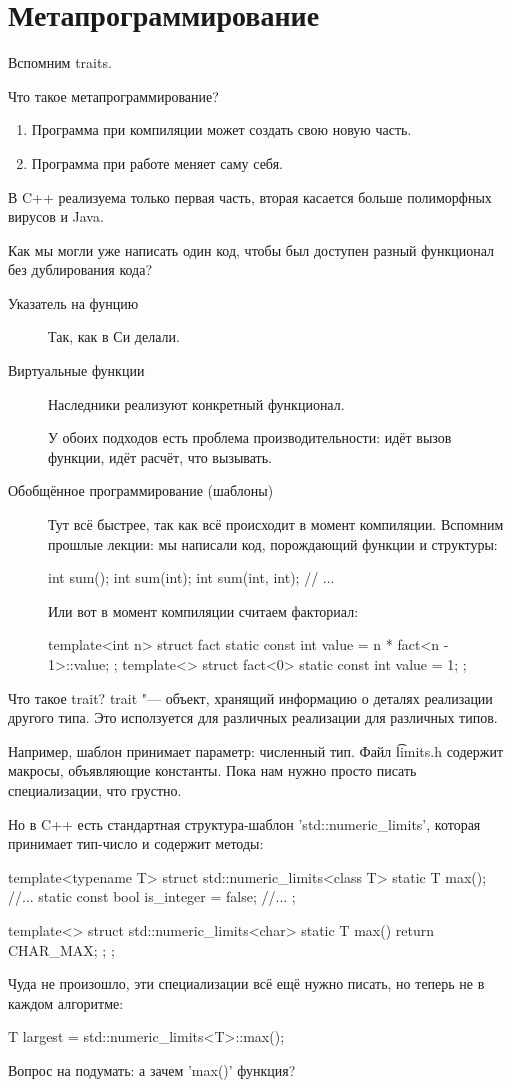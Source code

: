 \chapter{Метапрограммирование}

Вспомним traits.

Что такое метапрограммирование?
\begin{enumerate}
\item
	Программа при компиляции может создать свою новую часть.
\item
	Программа при работе меняет саму себя.
\end{enumerate}
В C++ реализуема только первая часть, вторая касается больше полиморфных вирусов и Java.

Как мы могли уже написать один код, чтобы был доступен разный функционал без дублирования кода?
\begin{description}
\item[Указатель на фунцию]
	Так, как в Си делали.
\item[Виртуальные функции]
	Наследники реализуют конкретный функционал.

	У обоих подходов есть проблема производительности: идёт вызов функции, идёт расчёт, что вызывать.

\item[Обобщённое программирование (шаблоны)]
	Тут всё быстрее, так как всё происходит в момент компиляции.
	Вспомним прошлые лекции: мы написали код, порождающий функции и структуры:
\begin{cppcode}
int sum();
int sum(int);
int sum(int, int);
// ...
\end{cppcode}
Или вот в момент компиляции считаем факториал:
\begin{cppcode}
template<int n>
struct fact {
	static const int value = n * fact<n - 1>::value;
};
template<>
struct fact<0> {
	static const int value = 1;
};
\end{cppcode}
\end{description}

Что такое trait? trait "--- объект, хранящий информацию о деталях реализации другого типа.
Это исползуется для различных реализации для различных типов.

Например, шаблон принимает параметр: численный тип.
Файл \t{limits.h} содержит макросы, объявляющие константы.
Пока нам нужно просто писать специализации, что грустно.

Но в C++ есть стандартная структура-шаблон \cpp'std::numeric_limits', которая принимает тип-число и содержит методы:
\begin{cppcode}
template<typename T>
struct std::numeric_limits<class T> {
	static T max();
	//...
	static const bool is_integer = false;
	//...
};

template<>
struct std::numeric_limits<char> {
	static T max() {
		return CHAR_MAX;
	};
};
\end{cppcode}
Чуда не произошло, эти специализации всё ещё нужно писать, но теперь не в каждом алгоритме:
\begin{cppcode}
T largest = std::numeric_limits<T>::max();
\end{cppcode}
Вопрос на подумать: а зачем \cpp'max()' функция?

